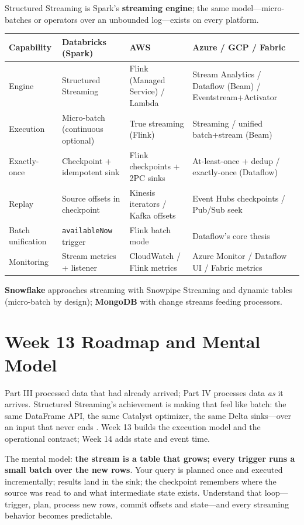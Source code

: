\begin{crosscloud}
Structured Streaming is Spark's \textbf{streaming engine}; the same model---micro-batches or
operators over an unbounded log---exists on every platform.

\vspace{2mm}
{\footnotesize
\begin{tabular}{@{}p{3.0cm}p{3.4cm}p{3.2cm}p{3.2cm}@{}}
\toprule
\textbf{Capability} & \textbf{Databricks (Spark)} & \textbf{AWS} & \textbf{Azure / GCP / Fabric} \\
\midrule
Engine & Structured Streaming & Flink (Managed Service) / Lambda & Stream Analytics / Dataflow (Beam) / Eventstream+Activator \\
Execution & Micro-batch (continuous optional) & True streaming (Flink) & Streaming / unified batch+stream (Beam) \\
Exactly-once & Checkpoint + idempotent sink & Flink checkpoints + 2PC sinks & At-least-once + dedup / exactly-once (Dataflow) \\
Replay & Source offsets in checkpoint & Kinesis iterators / Kafka offsets & Event Hubs checkpoints / Pub/Sub seek \\
Batch unification & \texttt{availableNow} trigger & Flink batch mode & Dataflow's core thesis \\
Monitoring & Stream metrics + listener & CloudWatch / Flink metrics & Azure Monitor / Dataflow UI / Fabric metrics \\
\bottomrule
\end{tabular}}

\vspace{1mm}
\textbf{Snowflake} approaches streaming with Snowpipe Streaming and dynamic tables (micro-batch
by design); \textbf{MongoDB} with change streams feeding processors.
\end{crosscloud}

\section{Week 13 Roadmap and Mental Model}
Part III processed data that had already arrived; Part IV processes data \emph{as} it arrives. Structured Streaming's achievement is making that feel like batch: the same DataFrame API, the same Catalyst optimizer, the same Delta sinks---over an input that never ends \cite{sparkStructuredStreaming}. Week 13 builds the execution model and the operational contract; Week 14 adds state and event time.

The mental model: \textbf{the stream is a table that grows; every trigger runs a small batch over the new rows}. Your query is planned once and executed incrementally; results land in the sink; the checkpoint remembers where the source was read to and what intermediate state exists. Understand that loop---trigger, plan, process new rows, commit offsets and state---and every streaming behavior becomes predictable.

